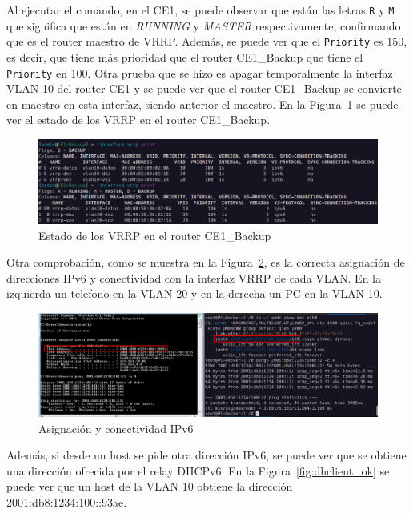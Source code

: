Al ejecutar el comando, en el CE1, se puede observar que están las letras \texttt{R} y \texttt{M} que significa que están en \textit{RUNNING} y \textit{MASTER} respectivamente, confirmando que es el router maestro de VRRP. Además, se puede ver que el \texttt{Priority} es 150, es decir, que tiene más prioridad que el router CE1\_Backup que tiene el
\texttt{Priority} en 100. Otra prueba que se hizo es apagar temporalmente la interfaz VLAN 10 del router CE1 y se puede ver que el router CE1\_Backup se convierte en maestro en esta interfaz, siendo anterior el maestro. En la Figura~\ref{fig:vrrp_output_2} se puede ver el estado de los VRRP en el router CE1\_Backup.
\begin{figure}[H]
	\centering
	\includegraphics[width=1\textwidth]{images/vrrp_output_2.png}
	\caption{Estado de los VRRP en el router CE1\_Backup}
	\label{fig:vrrp_output_2}
\end{figure}

Otra comprobación, como se muestra en la Figura~\ref{fig:test_DHCP6_pc}, es la correcta asignación de direcciones IPv6 y conectividad con la interfaz VRRP de cada VLAN. En la izquierda
un telefono en la VLAN 20 y en la derecha un PC en la VLAN 10.

\begin{figure}[H]
	\centering
	\includegraphics[width=1\textwidth]{images/test_DHCP6_ping.png}
	\caption{Asignación y conectividad IPv6}
	\label{fig:test_DHCP6_pc}
\end{figure}

Además, si desde un host se pide otra dirección IPv6, se puede ver que se obtiene una dirección ofrecida por el relay DHCPv6. En la Figura~\ref{fig:dhclient_ok} se puede ver que un host de la VLAN 10 obtiene la dirección 2001:db8:1234:100::93ae.

